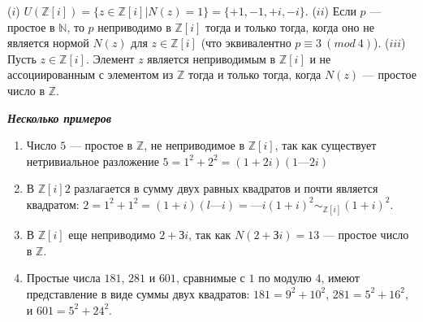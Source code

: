 \documentclass{../../template/mai_book}
\begin{document}
\begin{predl}
\textit{\indent} ($i$) $U(\mathds{Z}[i]) = \{z \in \mathds{Z}[i] | N(z) = 1\} = \{+1,-1,+i,-i\}$. \newline \indent ($ii$) Если $p$ — простое в $\mathds{N}$, то $p$ неприводимо в $\mathds{Z}[i]$ тогда и только тогда, когда оно не является нормой $N(z)$ для $z \in \mathds{Z}[i]$ (что эквивалентно $p \equiv 3\:(mod\:4)$). \newline \indent ($iii$) Пусть $z \in \mathds{Z}[i]$. Элемент $z$ является неприводимым в $\mathds{Z}[i]$ и не ассоциированным с элементом из $\mathds{Z}$ тогда и только тогда, когда $N(z)$ — простое число в $\mathds{Z}.$
\end{predl}

\noindent \textbf{ \large \textit{Несколько примеров}}
\begin{enumerate}
\item Число $5$ — простое в $\mathds{Z}$, не неприводимое в $\mathds{Z}[i]$, так как существует нетривиальное разложение $5 = 1^2 + 2^2 = (1 + 2i)(1 — 2i)$
\item В $\mathds{Z}[i] 2$ разлагается в сумму двух равных квадратов и почти является квадратом: $2 = 1^2  + 1^2  = (1 + i)(l — i) = —i(1 + i)^2 \sim_{\mathds{Z}[i]} (1 + i)^2.$
\item В $\mathds{Z}[i]$ еще неприводимо $2 + Зi$, так как $N(2 + Зi) = 13$ — простое число в $\mathds{Z}$.
\item Простые числа $181$, $281$ и $601$, сравнимые с $1$ по модулю $4$, имеют представление в виде суммы двух квадратов: $181 = 9^2 + 10^2$, $281 = 5^2 + 16^2$, и $601 = 5^2 + 24^2$.\\
\end{enumerate}
\end{document}
